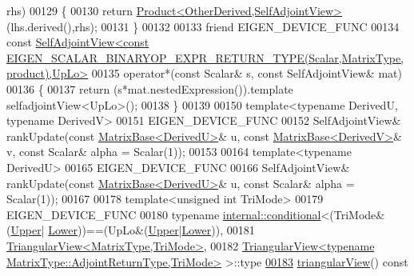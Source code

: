 \begin{DoxyCode}
      rhs)
00129     \{
00130       \textcolor{keywordflow}{return} \hyperlink{group___core___module_class_eigen_1_1_product}{Product<OtherDerived,SelfAdjointView>}(lhs.derived(),rhs);
00131     \}
00132     
00133     \textcolor{keyword}{friend} EIGEN\_DEVICE\_FUNC
00134     \textcolor{keyword}{const} 
      \hyperlink{group___core___module_class_eigen_1_1_self_adjoint_view}{SelfAdjointView<const EIGEN\_SCALAR\_BINARYOP\_EXPR\_RETURN\_TYPE(Scalar,MatrixType,product),UpLo>}
00135     operator*(\textcolor{keyword}{const} Scalar& s, \textcolor{keyword}{const} SelfAdjointView& mat)
00136     \{
00137       \textcolor{keywordflow}{return} (s*mat.nestedExpression()).\textcolor{keyword}{template} selfadjointView<UpLo>();
00138     \}
00139 
00150     \textcolor{keyword}{template}<\textcolor{keyword}{typename} DerivedU, \textcolor{keyword}{typename} DerivedV>
00151     EIGEN\_DEVICE\_FUNC
00152     SelfAdjointView& rankUpdate(\textcolor{keyword}{const} \hyperlink{group___core___module_class_eigen_1_1_matrix_base}{MatrixBase<DerivedU>}& u, \textcolor{keyword}{const} 
      \hyperlink{group___core___module_class_eigen_1_1_matrix_base}{MatrixBase<DerivedV>}& v, \textcolor{keyword}{const} Scalar& alpha = Scalar(1));
00153 
00164     \textcolor{keyword}{template}<\textcolor{keyword}{typename} DerivedU>
00165     EIGEN\_DEVICE\_FUNC
00166     SelfAdjointView& rankUpdate(\textcolor{keyword}{const} \hyperlink{group___core___module_class_eigen_1_1_matrix_base}{MatrixBase<DerivedU>}& u, \textcolor{keyword}{const} Scalar& alpha = 
      Scalar(1));
00167 
00178     \textcolor{keyword}{template}<\textcolor{keywordtype}{unsigned} \textcolor{keywordtype}{int} TriMode>
00179     EIGEN\_DEVICE\_FUNC
00180     \textcolor{keyword}{typename} \hyperlink{struct_eigen_1_1internal_1_1conditional}{internal::conditional}<(TriMode&(\hyperlink{group__enums_gga39e3366ff5554d731e7dc8bb642f83cda6bcb58be3b8b8ec84859ce0c5ac0aaec}{Upper}|
      \hyperlink{group__enums_gga39e3366ff5554d731e7dc8bb642f83cda891792b8ed394f7607ab16dd716f60e6}{Lower}))==(UpLo&(\hyperlink{group__enums_gga39e3366ff5554d731e7dc8bb642f83cda6bcb58be3b8b8ec84859ce0c5ac0aaec}{Upper}|\hyperlink{group__enums_gga39e3366ff5554d731e7dc8bb642f83cda891792b8ed394f7607ab16dd716f60e6}{Lower})),
00181                                    \hyperlink{group___core___module_class_eigen_1_1_triangular_view}{TriangularView<MatrixType,TriMode>},
00182                                    
      \hyperlink{group___core___module_class_eigen_1_1_triangular_view}{TriangularView<typename MatrixType::AdjointReturnType,TriMode>}
       >::type
\hyperlink{group___core___module_ac7b8bf0e2e4636b3d1e4f0564716bf6d}{00183}     \hyperlink{group___core___module_ac7b8bf0e2e4636b3d1e4f0564716bf6d}{triangularView}()\textcolor{keyword}{ const}

\end{DoxyCode}
